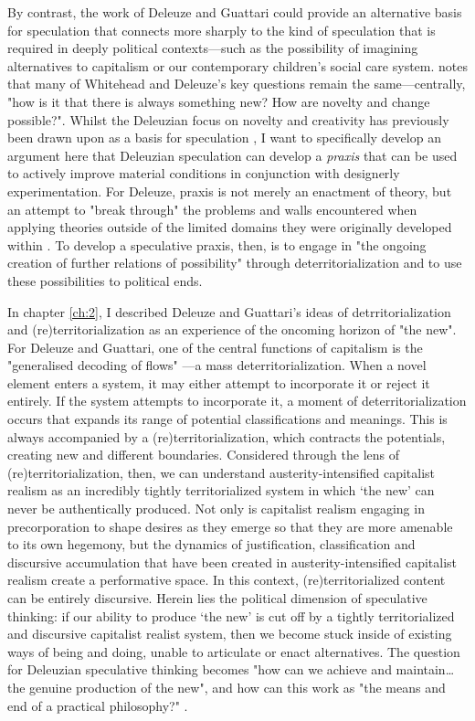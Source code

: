 By contrast, the work of Deleuze and Guattari could provide an alternative basis for speculation that connects more sharply to the kind of speculation that is required in deeply political contexts—such as the possibility of imagining alternatives to capitalism or our contemporary children's social care system. \citet[p. 23]{shaviro_deleuzes_2007} notes that many of Whitehead and Deleuze's key questions remain the same—centrally, "how is it that there is always something new? How are novelty and change possible?". Whilst the Deleuzian focus on novelty and creativity has previously been drawn upon as a basis for speculation \citep{savransky_developing_2017}, I want to specifically develop an argument here that Deleuzian speculation can develop a \textit{praxis} that can be used to actively improve material conditions in conjunction with designerly experimentation. For Deleuze, praxis is not merely an enactment of theory, but an attempt to "break through" the problems and walls encountered when applying theories outside of the limited domains they were originally developed within \citep[p. 206]{deleuze_desert_2004}. To develop a speculative praxis, then, is to engage in "the ongoing creation of further relations of possibility" through deterritorialization \citep[p. 365]{harrison_future_2020} and to use these possibilities to political ends.

In chapter \ref{ch:2}, I described Deleuze and Guattari's ideas of detrritorialization and (re)territorialization as an experience of the oncoming horizon of "the new". For Deleuze and Guattari, one of the central functions of capitalism is the "generalised decoding of flows" \citep[p. 153]{deleuze_anti-oedipus:_1983}—a mass deterritorialization. When a novel element enters a system, it may either attempt to incorporate it or reject it entirely. If the system attempts to incorporate it, a moment of deterritorialization occurs that expands its range of potential classifications and meanings. This is always accompanied by a (re)territorialization, which contracts the potentials, creating new and different boundaries. Considered through the lens of (re)territorialization, then, we can understand austerity-intensified capitalist realism as an incredibly tightly territorialized system in which ‘the new’ can never be authentically produced. Not only is capitalist realism engaging in precorporation to shape desires as they emerge so that they are more amenable to its own hegemony, but the dynamics of justification, classification and discursive accumulation that have been created in austerity-intensified capitalist realism create a performative space. In this context, (re)territorialized content can be entirely discursive. Herein lies the political dimension of speculative thinking: if our ability to produce ‘the new’ is cut off by a tightly territorialized and discursive capitalist realist system, then we become stuck inside of existing ways of being and doing, unable to articulate or enact alternatives. The question for Deleuzian speculative thinking becomes "how can we achieve and maintain… the genuine production of the new", and how can this work as "the means and end of a practical philosophy?" \citep[p. 2]{osullivan_deleuze_2008}. 

